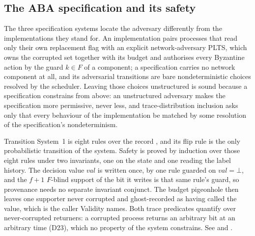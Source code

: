 


\subsection{The ABA specification and its safety}

The three specification systems locate the adversary differently from the implementations they stand for.
An implementation pairs processes that read only their own replacement flag with an explicit network-adversary PLTS, which owns the corrupted set together with its budget and authorises every Byzantine action by the guard $k \in F$ of a component; a specification carries no network component at all, and its adversarial transitions are bare nondeterministic choices resolved by the scheduler.
Leaving those choices unstructured is sound because a specification constrains from above: an unstructured adversary makes the specification more permissive, never less, and trace-distribution inclusion asks only that every behaviour of the implementation be matched by some resolution of the specification's nondeterminism.

Transition System~1 is eight rules over the record , and its flip rule is the only probabilistic transition of the system.
Safety is proved by induction over those eight rules under two invariants, one on the state and one reading the label history.
The decision value $val$ is written once, by one rule guarded on $val = \bot$, and the $f+1$ $F$-blind support of the bit it writes is that same rule's guard, so provenance needs no separate invariant conjunct.
The budget pigeonhole then leaves one supporter never corrupted and ghost-recorded as having called the value, which is the caller Validity names.
Both trace predicates quantify over never-corrupted returners: a corrupted process returns an arbitrary bit at an arbitrary time (D23), which no property of the system constrains.
See  and .

